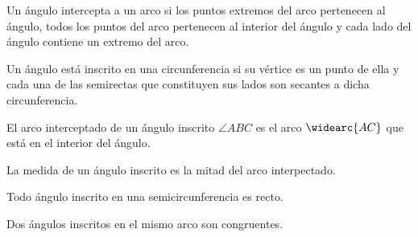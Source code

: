 \begin{definition}
    Un ángulo intercepta a un arco si los puntos extremos del arco pertenecen al ángulo, todos los puntos del arco pertenecen al interior del ángulo y cada lado del ángulo contiene un extremo del arco.
\end{definition}

\begin{definition}
    Un ángulo está inscrito en una circunferencia si su vértice es un punto de ella y cada una de las semirectas que constituyen sus lados son secantes a dicha circunferencia.
\end{definition}

\begin{definition}
    El arco interceptado de un ángulo inscrito $\angle{ABC}$ es el arco $\widearc{AC}$ que está en el interior del ángulo.
\end{definition}

\begin{theorem}
    La medida de un ángulo inscrito es la mitad del arco interpectado.

    \begin{figure}[!h]
        \centering
        
        \label{fig:theorem29}
    \end{figure}
    
\end{theorem}

\begin{theorem}
    Todo ángulo inscrito en una semicircunferencia es recto.

    \begin{figure}[!h]
        \centering
        
        \label{fig:theorem30}
    \end{figure}
    
\end{theorem}

\clearpage

\begin{theorem}
    Dos ángulos inscritos en el mismo arco son congruentes.

    \begin{figure}[!h]
        \centering
        
        \label{fig:theorem31}
    \end{figure}
    
\end{theorem}

